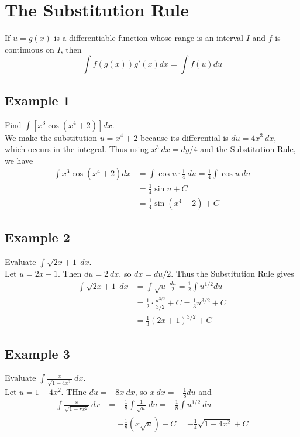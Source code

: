 \documentclass[11pt]{article}
\begin{document}
\pagebreak
\section{The Substitution Rule}
\begin{theo}
    If $ u=g(x) $ is a differentiable function whose range is an interval $ I $ and $ f $ is continuous on $ I $, then \[
        \int f(g(x))g'(x)dx = \int f(u) du
    \]
\end{theo}
\subsection{Example 1}
Find $ \displaystyle{\int[x^3\cos (x^4+2)]dx} $.
\\[8pt]
We make the substitution $ u=x^4+2 $ because its differential is $ du = 4x^3\ dx $, which occurs in the integral. Thus using $ x^3\ dx=dy/4 $ and the Substitution Rule, we have
\begin{align*}
    \int x^3\cos(x^4+2)dx &= \int \cos u \cdot \frac{1}{4}\ du = \frac{1}{4} \int \cos u\ du\\
    &=\frac{1}{4}\sin u + C\\
    &= \frac{1}{4}\sin (x^4+2) +C
\end{align*}

\subsection{Example 2}
Evaluate $ \displaystyle{\int \sqrt{2x+1}\ dx} $.
\\[8pt]
Let $ u=2x+1 $. Then $ du=2\ dx $, so $ dx=du/2 $. Thus the Substitution Rule gives
\begin{align*}
    \int \sqrt{2x+1}\ dx
    &= \int \sqrt{u}\ \frac{du}{2} = \frac{1}{2}\int u^{1/2}du\\
    &= \frac{1}{2}\cdot \frac{u^{3/2}}{3/2} + C = \frac{1}{3}u^{3/2} +C\\
    &= \frac{1}{3}(2x+1)^{3/2} +C
\end{align*}

\subsection{Example 3}
Evaluate $ \displaystyle{\int \frac{x}{\sqrt{1-4x^2}}\ dx} $.
\\[8pt]
Let $ u=1-4x^2 $. THne $ du=-8x\ dx $, so $ x\ dx = -\frac{1}{8}du $ and
\begin{align*}
    \int \frac{x}{\sqrt{1-rx^2}}\ dx &= -\frac{1}{8}\int \frac{1}{\sqrt{u}}\ du = -\frac{1}{8}\int u^{1/2}\ du\\
    &= -\frac{1}{8}(x\sqrt{u}) + C = -\frac{1}{4}\sqrt{1-4x^2} + C
\end{align*}
\end{document}
